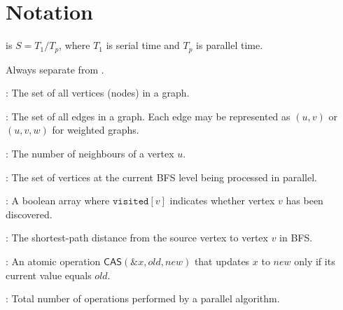 \chapter*{Notation}

\begin{ppdefn}
 is $S = T_1 / T_p$, where $T_1$ is serial time and $T_p$ is parallel time.
\end{ppdefn}

\begin{ppkey}
Always separate  from .
\end{ppkey}

\begin{ppdefn}
:
The set of all vertices (nodes) in a graph.
\end{ppdefn}

\begin{ppdefn}
:
The set of all edges in a graph. Each edge may be represented as $(u,v)$ or $(u,v,w)$ for weighted graphs.
\end{ppdefn}

\begin{ppdefn}
:
The number of neighbours of a vertex $u$.
\end{ppdefn}

\begin{ppdefn}
:
The set of vertices at the current BFS level being processed in parallel.
\end{ppdefn}

\begin{ppdefn}
:
A boolean array where $\texttt{visited}[v]$ indicates whether vertex $v$ has been discovered.
\end{ppdefn}

\begin{ppdefn}
:
The shortest-path distance from the source vertex to vertex $v$ in BFS.
\end{ppdefn}

\begin{ppdefn}
:
An atomic operation $\textsf{CAS}(\&x, old, new)$ that updates $x$ to $new$ only if its current value equals $old$.
\end{ppdefn}

\begin{ppdefn}
:
Total number of operations performed by a parallel algorithm.
\end{ppdefn}

